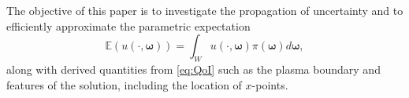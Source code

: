 The objective of this paper is to investigate the propagation of uncertainty and to efficiently approximate the parametric expectation
%
 \begin{equation}
 \label{eq:QoI}
      \mathbb{E}\left(u(\cdot,\boldsymbol \omega)\right)=\int_W u(\cdot,\boldsymbol{\omega})\pi(\boldsymbol\omega)d\boldsymbol{\omega},
 \end{equation}
%
along with derived quantities from \eqref{eq:QoI} such as the plasma boundary and features of the solution, including the location of $x$-points.








